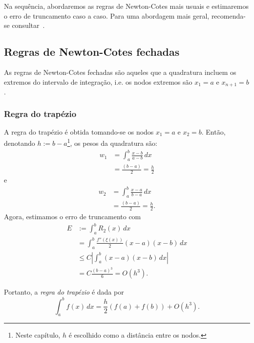 Na sequência, abordaremos as regras de Newton-Cotes mais usuais e estimaremos o erro de truncamento caso a caso. Para uma abordagem mais geral, recomenda-se consultar~\cite[Ch 7.,Sec. 1.1]{Isaacson1994a}.

\subsection{Regras de Newton-Cotes fechadas}

As regras de Newton-Cotes fechadas são aqueles que a quadratura incluem os extremos do intervalo de integração, i.e. os nodos extremos são $x_1=a$ e $x_{n+1}=b$.

\subsubsection{Regra do trapézio}

A regra do trapézio é obtida tomando-se os nodos $x_1=a$ e $x_2=b$. Então, denotando $h:=b-a$\footnote{Neste capítulo, $h$ é escolhido como a distância entre os nodos.}, os pesos da quadratura são:
\begin{align}
  w_1 &= \int_a^b \frac{x-b}{a-b}\,dx \\
  &= \frac{(b-a)}{2} = \frac{h}{2}
\end{align}
e
\begin{align}
  w_2 &= \int_a^b \frac{x-a}{b-a}\,dx \\
  &= \frac{(b-a)}{2} = \frac{h}{2}.
\end{align}
Agora, estimamos o erro de truncamento com
\begin{align}
  E &:= \int_a^b R_2(x)\,dx\\
  &= \int_a^b \frac{f''(\xi(x))}{2}(x-a)(x-b)\,dx\\
  &\leq C\left|\int_a^b (x-a)(x-b)\,dx\right|\\
  &= C\frac{(b-a)^3}{6} = O(h^3).
\end{align}

Portanto, a \emph{regra do trapézio} é dada por
\begin{equation}
  \int_a^b f(x)\,dx = \frac{h}{2}(f(a) + f(b)) + O(h^3).
\end{equation}

